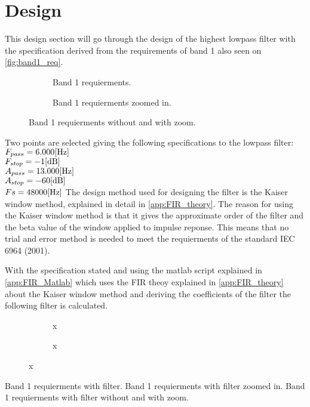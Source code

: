 \section{Design}
This design section will go through the design of the highest lowpass filter with the specification derived from the requirements of band 1 also seen on \autoref{fig:band1_req}.
\begin{figure}[H]
\centering
\begin{subfigure}[t]{0.45\textwidth}
	
	\caption{Band 1 requierments.}
	\label{fig:band1_req}
\end{subfigure}
\begin{subfigure}[t]{0.45\textwidth}
	
	\caption{Band 1 requierments zoomed in.}
	\label{fig:band1_reqZoom}
\end{subfigure}
\caption{Band 1 requierments without and with zoom.}
\label{fig:band1_reqOverview}
\end{figure}
Two points are selected giving the following specifications to the lowpass filter:
$F_{pass}=6.000 \enhed{Hz}$\\
$F_{stop}=-1 \enhed{dB}$\\
$A_{pass}=13.000 \enhed{Hz}$\\
$A_{stop}=-60 \enhed{dB}$\\
$Fs=48000 \enhed{Hz}$
The design method used for designing the filter is the Kaiser window method, explained in detail in \autoref{app:FIR_theory}. The reason for using the Kaiser window method is that it gives the approximate order of the filter and the beta value of the window applied to impulse reponse. This means that no trial and error method is needed to meet the requierments of the standard IEC 6964 (2001).

With the specification stated and using the matlab script explained in \autoref{app:FIR_Matlab} which uses the FIR theoy explained in \autoref{app:FIR_theory} about the Kaiser window method and deriving the coefficients of the filter the following filter is calculated. 
\begin{figure}[H]
\centering
\begin{subfigure}[t]{0.47\textwidth}
	\scalebox{0.5}{
	}
	\caption{x}
	\label{fig:band1_filt}
\end{subfigure}
\hspace{6mm} 
\begin{subfigure}[t]{0.35\textwidth}
	\scalebox{0.5}{
	}
	\caption{x}
	\label{fig:band1_filtZoom}
\end{subfigure}
\caption{x}
\label{fig:band1_FiltOverview}
\end{figure}


Band 1 requierments with filter.
Band 1 requierments with filter zoomed in.
Band 1 requierments with filter without and with zoom.


  